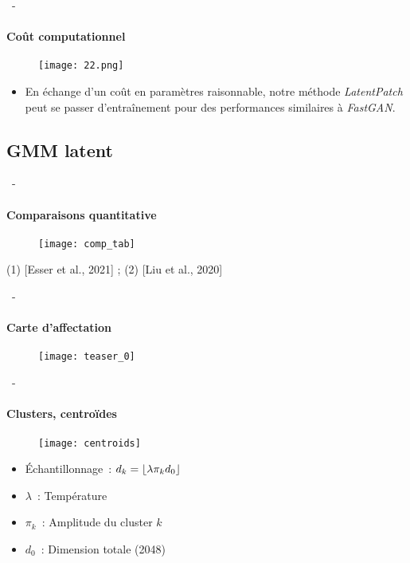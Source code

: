 \documentclass[aspectratio=169, 22pt]{beamer}
\DeclarePairedDelimiter\floor{\lfloor}{\rfloor}
\begin{document}
\begin{frame}[noframenumbering]{\secname~- \subsecname}
  \framesubtitle{Coût computationnel}
  \begin{figure}
    \texttt{[image: 22.png]}
  \end{figure}
  \begin{itemize}
  \item En échange d'un coût en paramètres raisonnable, notre méthode
    \emph{LatentPatch} peut se passer d'entraînement pour des performances
    similaires à \emph{FastGAN}.
  \end{itemize}
\end{frame}

\subsection{GMM latent}
\begin{frame}[noframenumbering]{\secname~- \subsecname}
  \framesubtitle{Comparaisons quantitative}
  \begin{figure}
    \texttt{[image: comp\_tab]}
  \end{figure}
  \scriptsize (1) [Esser et al., 2021] ; (2) [Liu et al., 2020]
\end{frame}

\begin{frame}[noframenumbering]{\secname~- \subsecname}
  \framesubtitle{Carte d'affectation}
  \begin{figure}
    \texttt{[image: teaser\_0]}
  \end{figure}
\end{frame}

\begin{frame}[noframenumbering]{\secname~- \subsecname}
  \framesubtitle{Clusters, centroïdes}
  \begin{figure}
    \texttt{[image: centroids]}    
  \end{figure}
  \begin{itemize}
  \item Échantillonnage : $d_k = \floor*{\lambda \pi_k d_0}$
  \item $\lambda$ : Température
  \item $\pi_k$ : Amplitude du cluster $k$
  \item $d_0$ : Dimension totale (2048)
  \end{itemize}
\end{frame}
\end{document}

